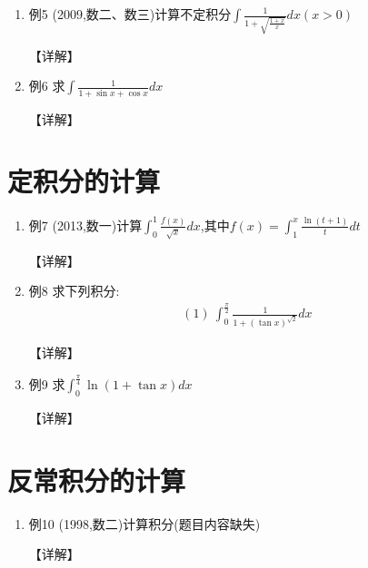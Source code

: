 \documentclass[12pt, a4paper, oneside, UTF8]{ctexbook}
\begin{document}
\begin{enumerate}[label=\arabic*.,start=4]
    \item 例5 (2009,数二、数三)计算不定积分$\int\frac{1}{1+\sqrt{\frac{1+x}{x}}}dx(x>0)$
    
    \begin{solution}
    【详解】
    \end{solution}
    
    \item 例6 求$\int\frac{1}{1+\sin x+\cos x} dx$
    
    \begin{solution}
    【详解】
    \end{solution}
\end{enumerate}

\section{ 定积分的计算}

\begin{enumerate}[label=\arabic*.,start=6]
    \item 例7 (2013,数一)计算$\int_0^1\frac{f(x)}{\sqrt{x}} dx$,其中$f(x)=\int_1^x\frac{\ln(t+1)}{t} dt$
    
    \begin{solution}
    【详解】
    \end{solution}
    
    \item 例8 求下列积分:
    \begin{align*}
        (1)\ \int_0^{\frac{\pi}{2}}\frac{1}{1+(\tan x)^{\sqrt{2}}} dx
    \end{align*}
    
    \begin{solution}
    【详解】
    \end{solution}
    
    \item 例9 求$\int_0^{\frac{\pi}{4}}\ln(1+\tan x) dx$
    
    \begin{solution}
    【详解】
    \end{solution}
\end{enumerate}

\section{ 反常积分的计算}

\begin{enumerate}[label=\arabic*.,start=9]
    \item 例10 (1998,数二)计算积分(题目内容缺失)
    
    \begin{solution}
    【详解】
    \end{solution}
\end{enumerate}
\end{document}
